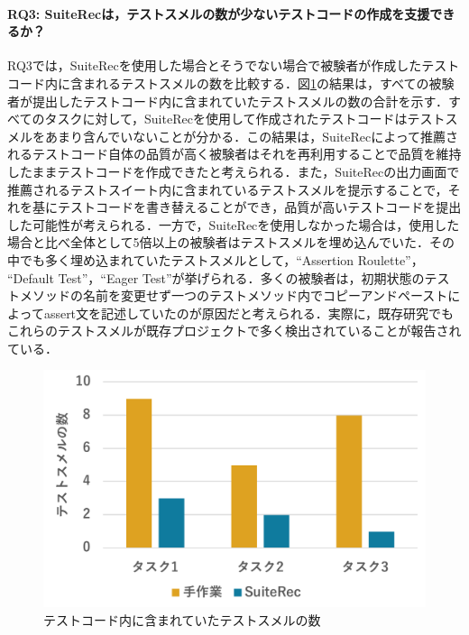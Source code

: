 \documentclass[12pt]{jarticle} %
\begin{document}
\paragraph{RQ3: {\sf SuiteRec}は，テストスメルの数が少ないテストコードの作成を支援できるか？}RQ3では，{\sf SuiteRec}を使用した場合とそうでない場合で被験者が作成したテストコード内に含まれるテストスメルの数を比較する．図\ref{smell}の結果は，すべての被験者が提出したテストコード内に含まれていたテストスメルの数の合計を示す．すべてのタスクに対して，{\sf SuiteRec}を使用して作成されたテストコードはテストスメルをあまり含んでいないことが分かる．この結果は，{\sf SuiteRec}によって推薦されるテストコード自体の品質が高く被験者はそれを再利用することで品質を維持したままテストコードを作成できたと考えられる．また，{\sf SuiteRec}の出力画面で推薦されるテストスイート内に含まれているテストスメルを提示することで，それを基にテストコードを書き替えることができ，品質が高いテストコードを提出した可能性が考えられる．一方で，{\sf SuiteRec}を使用しなかった場合は，使用した場合と比べ全体として5倍以上の被験者はテストスメルを埋め込んでいた．その中でも多く埋め込まれていたテストスメルとして，``Assertion Roulette''， ``Default Test''，``Eager Test''が挙げられる．多くの被験者は，初期状態のテストメソッドの名前を変更せず一つのテストメソッド内でコピーアンドペーストによってassert文を記述していたのが原因だと考えられる．実際に，既存研究でもこれらのテストスメルが既存プロジェクトで多く検出されていることが報告されている\cite{Peruma}．

\begin{figure}[htbp]
  \begin{center}
   \includegraphics[width=12cm]{pic/smells.pdf}
  \caption{テストコード内に含まれていたテストスメルの数}
  \label{smell}
  \end{center}
\end{figure}
\end{document}
